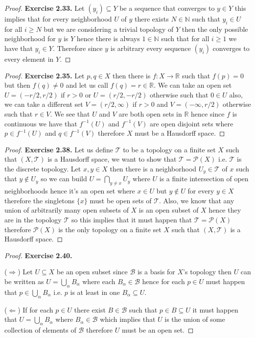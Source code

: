 \documentclass[11pt]{article}
\newcommand{\N}{\mathbb{N}}
\newcommand{\R}{\mathbb{R}}
\newcommand{\Topo}{\mathcal{T}}
\theoremstyle{definition}
\begin{document}
\cleardoublepage
\begin{proof}{\textbf{Exercise 2.33.}}
    Let $(y_i) \subseteq Y$ be a sequence that converges to $y \in Y$
    this implies that for every
    neighborhood $U$ of $y$ there exists $N \in \N$ such that $y_i \in U$ for
    all $i \geq N$ but we are considering a trivial topology of $Y$
    then the only possible neighborhood for $y$ is $Y$ hence there is always
    $1 \in \N$ such that for all $i \geq 1$ we have that $y_i \in Y$.
    Therefore since $y$ is arbitrary every sequence $(y_i)$ converges to every
    element in $Y$.
\end{proof}
\begin{proof}{\textbf{Exercise 2.35.}}
    Let $p,q \in X$ then there is $f:X \to \R$ such that $f(p) = 0$ but then
    $f(q) \neq 0$ and let us call $f(q) = r \in \R$.
    We can take an open set $U = (-r/2 , r/2)$ if $r > 0$ or
    $U = (r/2, -r/2)$ otherwise such that $0 \in U$
    also, we can take a different set $V = (r/2, \infty)$ if $r > 0$ and
    $V = (-\infty, r/2)$ otherwise such that $r \in V$.
    We see that $U$ and $V$ are both open sets in $\R$ hence since $f$ is
    continuous we have that $f^{-1}(U)$ and $f^{-1}(V)$ are open disjoint sets
    where $p \in f^{-1}(U)$ and $q \in f^{-1}(V)$ therefore $X$ must be a
    Hausdorff space.
\end{proof}
\begin{proof}{\textbf{Exercise 2.38.}}
    Let us define $\Topo$ to be a topology on a finite set $X$ such that
    $(X, \Topo)$ is a Hausdorff space, we want to show that
    $\Topo = \mathcal{P}(X)$ i.e. $\Topo$ is the discrete topology.
    Let $x,y \in X$ then there is a neighborhood $U_y \in \Topo$ of $x$
    such that $y \not\in U_y$ so we can build $U = \bigcap_{y\neq x} U_y$
    where $U$ is a finite intersection of open
    neighborhoods hence it's an open set where $x \in U$ but $y \not\in U$
    for every $y \in X$ therefore the singletons $\{x\}$ must be open sets
    of $\Topo$. Also, we know that any union of arbitrarily many open
    subsets of $X$ is an open subset of $X$ hence they are in the topology
    $\Topo$ so this implies that it must happen that $\Topo = \mathcal{P}(X)$
    therefore $\mathcal{P}(X)$ is the only topology on a finite set $X$ such
    that $(X, \Topo)$ is a Hausdorff space.
\end{proof}
\begin{proof}{\textbf{Exercise 2.40.}}

    ($\Rightarrow$) Let $U \subseteq X$ be an open subset since $\mathcal{B}$
    is a basis for $X$'s topology then $U$ can be written as
    $U = \bigcup_{\alpha} B_\alpha$ where each $B_\alpha \in \mathcal{B}$
    hence for each $p \in U$ must happen that 
    $p \in \bigcup_{\alpha} B_\alpha$ i.e. $p$ is at least in one
    $B_\alpha \subseteq U$.

    ($\Leftarrow$) If for each $p \in U$ there exist $B \in \mathcal{B}$
    such that $p \in B \subseteq U$ it must happen that
    $U = \bigcup_{\alpha} B_\alpha$ where $B_\alpha \in \mathcal{B}$
    which implies that $U$ is the union of some collection of elements of
    $\mathcal{B}$ therefore $U$ must be an open set.

\end{proof}
\end{document}
